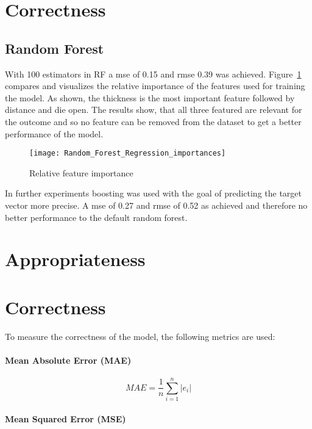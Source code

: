 \section{Correctness}
\subsection{Random Forest}
With 100 estimators in \ac{RF} a \ac{mse} of 0.15 and \ac{rmse} 0.39 was achieved.
Figure~\ref{fig:rf_feature_importance} compares and visualizes the relative importance of the features used for training the model.
As shown, the thickness is the most important feature followed by distance and die open. The results show, that all three featured are relevant for the outcome and so no feature can be removed from the dataset to get a better performance of the model.


\begin{figure}[H]
    \centering
    \texttt{[image: Random\_Forest\_Regression\_importances]}
    \caption{Relative feature importance}
    \label{fig:rf_feature_importance}
\end{figure}

In further experiments boosting was used with the goal of predicting the target vector more precise. A \ac{mse} of 0.27 and \ac{rmse} of 0.52 as achieved and therefore no better performance to the default random forest.


\section{Appropriateness}

\section{Correctness}
To measure the correctness of the model, the following metrics are used: 

\paragraph*{Mean Absolute Error (MAE)}

\begin{equation}
    \label{eq:mae}
    MAE = \frac{1}{n} \sum_{i=1}^{n} |e_i|
\end{equation}

\paragraph*{Mean Squared Error (MSE)}

